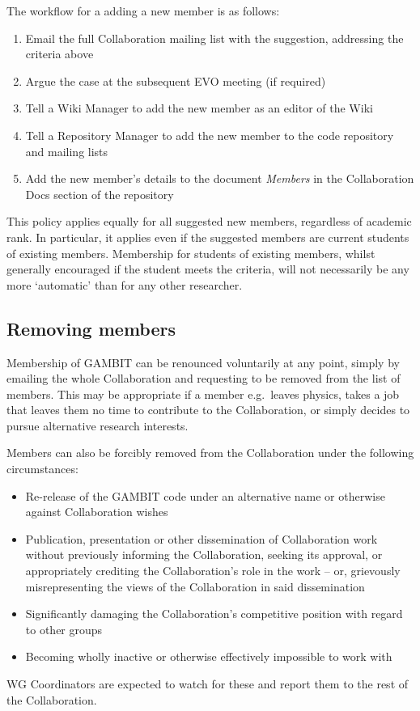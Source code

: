 The workflow for a adding a new member is as follows:
\begin{enumerate}
\item Email the full Collaboration mailing list with the suggestion, addressing the criteria above
\item Argue the case at the subsequent EVO meeting (if required)
\item Tell a Wiki Manager to add the new member as an editor of the Wiki
\item Tell a Repository Manager to add the new member to the code repository and mailing lists
\item Add the new member's details to the document \textit{Members} in the Collaboration Docs section of the repository
\end{enumerate}

This policy applies equally for all suggested new members, regardless of academic rank.  In particular, it applies even if the suggested members are current students of existing members.  Membership for students of existing members, whilst generally encouraged if the student meets the criteria, will not necessarily be any more `automatic' than for any other researcher.

\subsection{Removing members}

Membership of GAMBIT can be renounced voluntarily at any point, simply by emailing the whole Collaboration and requesting to be removed from the list of members.  This may be appropriate if a member e.g.\ leaves physics, takes a job that leaves them no time to contribute to the Collaboration, or simply decides to pursue alternative research interests.

Members can also be forcibly removed from the Collaboration under the following circumstances:\begin{itemize}
\item Re-release of the GAMBIT code under an alternative name or otherwise against Collaboration wishes 
\item Publication, presentation or other dissemination of Collaboration work without previously informing the Collaboration, seeking its approval, or appropriately crediting the Collaboration's role in the work -- or, grievously misrepresenting the views of the Collaboration in said dissemination
\item Significantly damaging the Collaboration's competitive position with regard to other groups 
\item Becoming wholly inactive or otherwise effectively impossible to work with
\end{itemize}
WG Coordinators are expected to watch for these and report them to the rest of the Collaboration.

